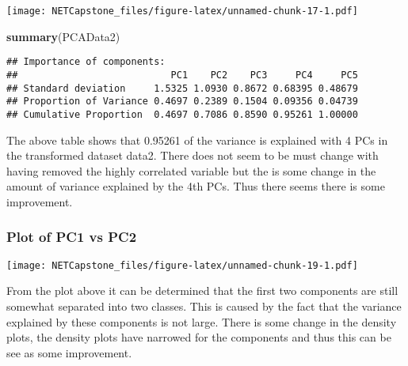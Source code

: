 \documentclass[
]{article}
\newenvironment{Shaded}{\begin{snugshade}}{\end{snugshade}}
\newcommand{\DataTypeTok}[1]{\textcolor[rgb]{0.13,0.29,0.53}{#1}}
\newcommand{\FloatTok}[1]{\textcolor[rgb]{0.00,0.00,0.81}{#1}}
\newcommand{\KeywordTok}[1]{\textcolor[rgb]{0.13,0.29,0.53}{\textbf{#1}}}
\newcommand{\NormalTok}[1]{#1}
\newcommand{\OperatorTok}[1]{\textcolor[rgb]{0.81,0.36,0.00}{\textbf{#1}}}
\newcommand{\StringTok}[1]{\textcolor[rgb]{0.31,0.60,0.02}{#1}}
\begin{document}
\texttt{[image: NETCapstone\_files/figure-latex/unnamed-chunk-17-1.pdf]}

\begin{Shaded}
\begin{Highlighting}[]
\KeywordTok{summary}\NormalTok{(PCAData2)}
\end{Highlighting}
\end{Shaded}

\begin{verbatim}
## Importance of components:
##                           PC1    PC2    PC3     PC4     PC5
## Standard deviation     1.5325 1.0930 0.8672 0.68395 0.48679
## Proportion of Variance 0.4697 0.2389 0.1504 0.09356 0.04739
## Cumulative Proportion  0.4697 0.7086 0.8590 0.95261 1.00000
\end{verbatim}

The above table shows that 0.95261 of the variance is explained with 4
PCs in the transformed dataset data2. There does not seem to be must
change with having removed the highly correlated variable but the is
some change in the amount of variance explained by the 4th PCs. Thus
there seems there is some improvement.

\hypertarget{plot-of-pc1-vs-pc2-1}{%
\subsubsection{Plot of PC1 vs PC2}\label{plot-of-pc1-vs-pc2-1}}

\begin{Shaded}
\end{Shaded}

\texttt{[image: NETCapstone\_files/figure-latex/unnamed-chunk-19-1.pdf]}

From the plot above it can be determined that the first two components
are still somewhat separated into two classes. This is caused by the
fact that the variance explained by these components is not large. There
is some change in the density plots, the density plots have narrowed for
the components and thus this can be see as some improvement.
\end{document}
